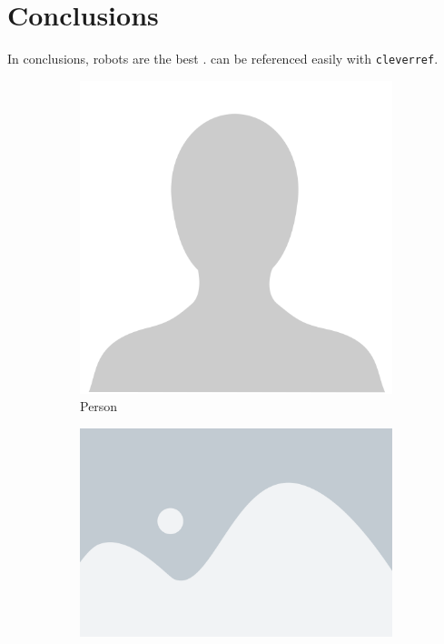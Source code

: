 \section{Conclusions}

In conclusions, robots are the best \cite{TUG2017}.
 can be referenced easily
with \texttt{cleverref}.

\begin{figure}[h]
    \begin{subfigure}{.45\textwidth}
        \includegraphics[width=\textwidth]{src/placeholders/person.png}
        \caption{Person}
        \label{fig:person-conclusion}
    \end{subfigure}
    \hfill
    \begin{subfigure}{.45\textwidth}
        \includegraphics[width=\textwidth]{src/placeholders/figure.png}

\end{subfigure}
\end{figure}
